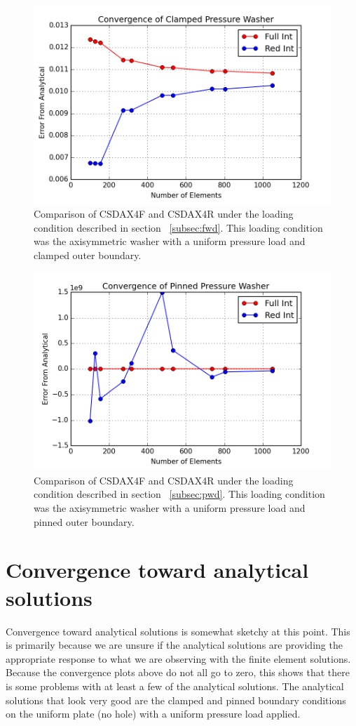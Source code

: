 \documentclass[10pt,letterpaper]{report}
\numberwithin{equation}{chapter}
\begin{document}
\begin{figure}[H]
\centering
\includegraphics[width=0.7\linewidth]{./GoodImages/Conv_WaPrCl_1}
\caption[H refinement of CSDAX4F]{Comparison of CSDAX4F and CSDAX4R under the loading condition described in section ~\ref{subsec:fwd}.  This loading condition was the axisymmetric washer with a uniform pressure load and clamped outer boundary.}
\label{fig:Conv_PlPoCl_1}
\end{figure}

\begin{figure}[H]
\centering
\includegraphics[width=0.7\linewidth]{./GoodImages/Conv_WaPrPi_1}
\caption[H refinement of CSDAX4F]{Comparison of CSDAX4F and CSDAX4R under the loading condition described in section ~\ref{subsec:pwd}. This loading condition was the axisymmetric washer with a uniform pressure load and pinned outer boundary.}
\label{fig:Conv_PlPoCl_1}
\end{figure}




\section{Convergence toward analytical solutions}
Convergence toward analytical solutions is somewhat sketchy at this point. This is primarily because we are unsure if the analytical solutions are providing the appropriate response to what we are observing with the finite element solutions. Because the convergence plots above do not all go to zero, this shows that there is some problems with at least a few of the analytical solutions. The analytical solutions that look very good are the clamped and pinned boundary conditions on the uniform plate (no hole) with a uniform pressure load applied. 
\end{document}
